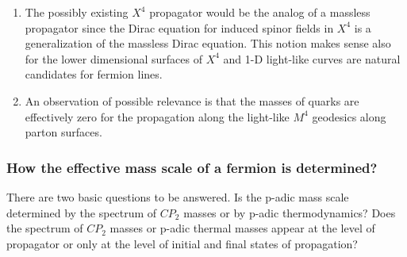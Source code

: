 \documentclass[10pt,epsf]{article}
\begin{document}
\begin{enumerate}

\item The possibly existing  $X^4$ propagator would be the analog of a massless propagator  since  the Dirac equation for induced spinor fields in $X^4$ is a generalization of the massless Dirac equation. This notion makes sense also for the lower dimensional surfaces of $X^4$ and 1-D light-like curves are  natural candidates for fermion lines.

\item An observation of possible relevance is that  the masses of quarks are effectively zero for the  propagation along the light-like $M^4$ geodesics along parton surfaces. 

\end{enumerate}




\subsubsection{How the effective mass scale of a fermion is determined?}

 There are two basic questions to be answered. Is the p-adic mass scale determined by the spectrum of $CP_2$ masses or by p-adic thermodynamics? Does the spectrum  of $CP_2$ masses or p-adic thermal masses appear at the level of propagator or only at the level of initial and final states of propagation?
 
\end{document}
